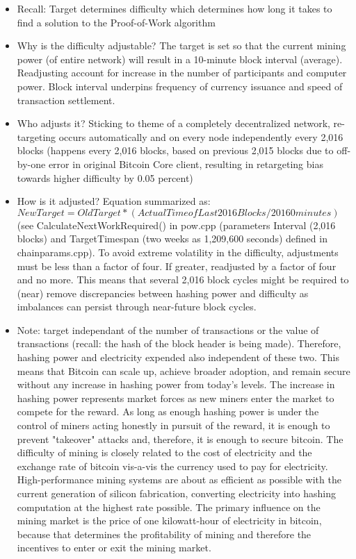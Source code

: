 \documentclass[english, 11pt]{article}
\begin{document}
\begin{itemize}
    \item Recall: Target determines difficulty which determines how long it takes to find a solution to the Proof-of-Work algorithm
    \item Why is the difficulty adjustable? The target is set so that the current mining power (of entire network) will result in a 10-minute block interval (average). Readjusting account for increase in the number of participants and computer power. Block interval underpins frequency of currency issuance and speed of transaction settlement.
    \item Who adjusts it? Sticking to theme of a completely decentralized network, re-targeting occurs automatically and on every node independently every 2,016 blocks (happens every 2,016 blocks, based on previous 2,015 blocks due to off-by-one error in original Bitcoin Core client, resulting in retargeting bias towards higher difficulty by 0.05 percent)
    \item How is it adjusted? Equation summarized as: \(New Target = Old Target * (Actual Time of Last 2016 Blocks / 20160 minutes)\) (see CalculateNextWorkRequired() in pow.cpp (parameters Interval (2,016 blocks) and TargetTimespan (two weeks as 1,209,600 seconds) defined in chainparams.cpp). To avoid extreme volatility in the difficulty, adjustments must be less than a factor of four. If greater, readjusted by a factor of four and no more. This means that several 2,016 block cycles might be required to (near) remove discrepancies between hashing power and difficulty as imbalances can persist through near-future block cycles.
    \item Note: target independant of the number of transactions or the value of transactions (recall: the hash of the block header is being made). Therefore, hashing power and electricity expended also independent of these two. This means that Bitcoin can scale up, achieve broader adoption, and remain secure without any increase in hashing power from today's levels. The increase in hashing power represents market forces as new miners enter the market to compete for the reward. As long as enough hashing power is under the control of miners acting honestly in pursuit of the reward, it is enough to prevent "takeover" attacks and, therefore, it is enough to secure bitcoin. The difficulty of mining is closely related to the cost of electricity and the exchange rate of bitcoin vis-a-vis the currency used to pay for electricity. High-performance mining systems are about as efficient as possible with the current generation of silicon fabrication, converting electricity into hashing computation at the highest rate possible. The primary influence on the mining market is the price of one kilowatt-hour of electricity in bitcoin, because that determines the profitability of mining and therefore the incentives to enter or exit the mining market.
\end{itemize}
\end{document}
